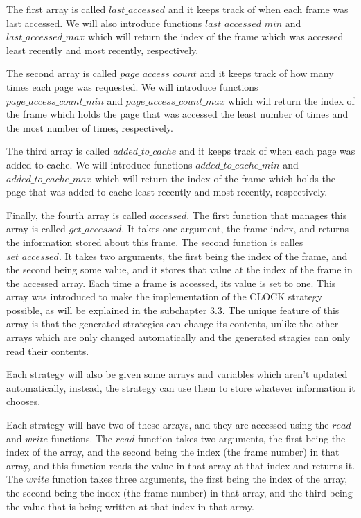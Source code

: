 The first array is called $last\_accessed$ and it keeps track of when each frame was last accessed. We will also introduce functions $last\_accessed\_min$ and $last\_accessed\_max$ which will return the index of the frame which was accessed least recently and most recently, respectively.

The second array is called $page\_access\_count$ and it keeps track of how many times each page was requested. We will introduce functions $page\_access\_count\_min$ and $page\_access\_count\_max$ which will return the index of the frame which holds the page that was accessed the least number of times and the most number of times, respectively.

The third array is called $added\_to\_cache$ and it keeps track of when each page was added to cache. We will introduce functions $added\_to\_cache\_min$ and $added\_to\_cache\_max$ which will return the index of the frame which holds the page that was added to cache least recently and most recently, respectively.

Finally, the fourth array is called $accessed$. The first function that manages this array is called $get\_accessed$. It takes one argument, the frame index, and returns the information stored about this frame. The second function is calles $set\_accessed$. It takes two arguments, the first being the index of the frame, and the second being some value, and it stores that value at the index of the frame in the accessed array. Each time a frame is accessed, its value is set to one. This array was introduced to make the implementation of the CLOCK strategy possible, as will be explained in the subchapter 3.3. The unique feature of this array is that the generated strategies can change its contents, unlike the other arrays which are only changed automatically and the generated stragies can only read their contents.

Each strategy will also be given some arrays and variables which aren't updated automatically, instead, the strategy can use them to store whatever information it chooses. 

Each strategy will have two of these arrays, and they are accessed using the $read$ and $write$ functions. The $read$ function takes two arguments, the first being the index of the array, and the second being the index (the frame number) in that array, and this function reads the value in that array at that index and returns it. The $write$ function takes three arguments, the first being the index of the array, the second being the index (the frame number) in that array, and the third being the value that is being written at that index in that array.

